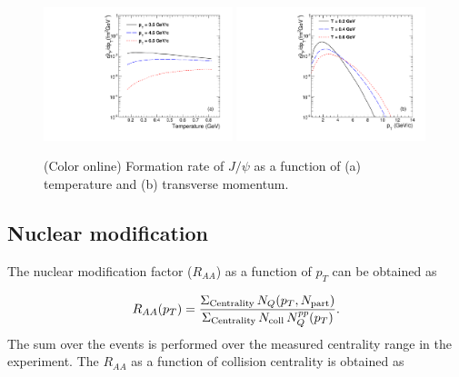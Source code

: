 \documentclass[12pt,a4paper,final]{iopart} %
\newcommand{\Jpsi}{J/\psi}
\newcommand{\raa}{R_{AA}}
\begin{document}
\begin{figure}
\includegraphics[width=0.49\textwidth]{Fig4a_FormRateVsT.pdf}
\includegraphics[width=0.49\textwidth]{Fig4b_FormRateVsPt.pdf}
\caption{(Color online) Formation rate of  $\Jpsi$ as a function of (a) temperature and 
(b) transverse momentum.}
\label{fig:ForRateVsTempAndPt}
\end{figure}


\subsection{Nuclear modification}

The nuclear modification factor ($R_{AA}$) as a function of $p_T$ can be obtained as 

\begin{equation}
  R_{AA}(p_T)= \frac{ \Sigma_{\rm Centrality} \, N_Q(p_T,N_{\rm part})}
                    { \Sigma_{\rm Centrality} \, N_{\rm coll} \, N_{Q}^{pp}(p_T)}.
\label{raa}
\end{equation}
The sum over the events is performed over the measured centrality range in the
experiment. The $\raa$ as a function of collision centrality is obtained as
\end{document}

